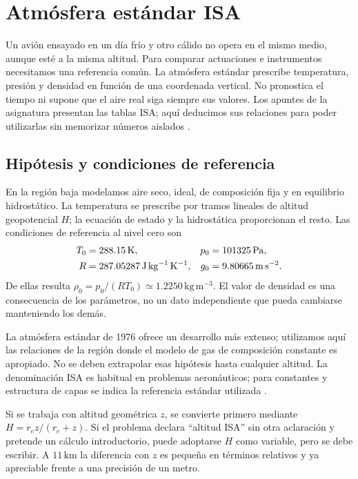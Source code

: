 \chapter{Atmósfera estándar ISA}\label{ch:04}

Un avión ensayado en un día frío y otro cálido no opera en el mismo medio, aunque esté a la misma altitud. Para comparar actuaciones e instrumentos necesitamos una referencia común. La atmósfera estándar prescribe temperatura, presión y densidad en función de una coordenada vertical. No pronostica el tiempo ni supone que el aire real siga siempre sus valores. Los apuntes de la asignatura presentan las tablas ISA; aquí deducimos sus relaciones para poder utilizarlas sin memorizar números aislados \cite{TAE2,ISA1976}.

\section{Hipótesis y condiciones de referencia}
En la región baja modelamos aire seco, ideal, de composición fija y en equilibrio hidrostático. La temperatura se prescribe por tramos lineales de altitud geopotencial $H$; la ecuación de estado y la hidrostática proporcionan el resto. Las condiciones de referencia al nivel cero son
\begin{align}
 T_0&=288.15\,\mathrm{K},& p_0&=101325\,\mathrm{Pa},\\
 R&=287.05287\,\mathrm{J\,kg^{-1}\,K^{-1}},& g_0&=9.80665\,\mathrm{m\,s^{-2}}.
\end{align}
De ellas resulta $\rho_0=p_0/(RT_0)\simeq1.2250\,\mathrm{kg\,m^{-3}}$. El valor de densidad es una consecuencia de los parámetros, no un dato independiente que pueda cambiarse manteniendo los demás.

La atmósfera estándar de 1976 ofrece un desarrollo más extenso; utilizamos aquí las relaciones de la región donde el modelo de gas de composición constante es apropiado. No se deben extrapolar esas hipótesis hasta cualquier altitud. La denominación ISA es habitual en problemas aeronáuticos; para constantes y estructura de capas se indica la referencia estándar utilizada \cite{ISA1976}.

Si se trabaja con altitud geométrica $z$, se convierte primero mediante $H=r_ez/(r_e+z)$. Si el problema declara ``altitud ISA'' sin otra aclaración y pretende un cálculo introductorio, puede adoptarse $H$ como variable, pero se debe escribir. A $11\,\mathrm{km}$ la diferencia con $z$ es pequeña en términos relativos y ya apreciable frente a una precisión de un metro.

